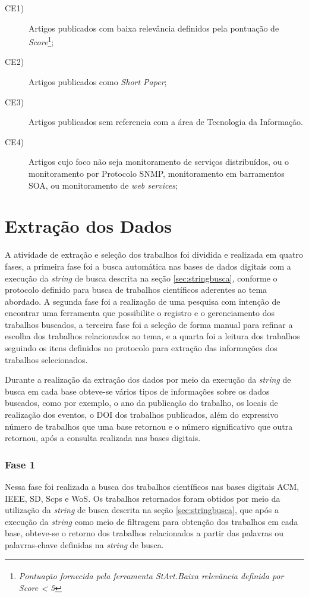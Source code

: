 \begin{description}
\item[CE1)] Artigos publicados com baixa relevância definidos pela pontuação de \textit{Score}\footnote{\textit{Pontuação fornecida pela ferramenta \acrshort{StArt}\textsuperscript{\textregistered}.Baixa relevância definida por \textit{Score} < 5}};
\item[CE2)] Artigos publicados como \textit{Short Paper};
\item[CE3)] Artigos publicados sem referencia com a área de Tecnologia da Informação.
\item[CE4)]Artigos cujo foco não seja monitoramento de serviços distribuídos, ou o monitoramento por Protocolo \acrshort{SNMP}, monitoramento em barramentos \acrshort{SOA}, ou monitoramento de \textit{web services};
\end{description}



\section{Extração dos Dados}
A atividade de extração e seleção dos trabalhos foi dividida e realizada em quatro fases, a primeira fase foi a busca automática nas bases de dados digitais com a execução da \textit{string} de busca descrita na seção \ref{sec:stringbusca}, conforme o protocolo definido para busca de trabalhos científicos aderentes ao tema abordado. A segunda fase foi a realização de uma pesquisa com intenção de encontrar uma ferramenta que possibilite o registro e o gerenciamento dos trabalhos buscados, a terceira fase foi a seleção de forma manual para refinar a escolha dos trabalhos relacionados ao tema, e a quarta foi a leitura dos trabalhos seguindo os itens definidos no protocolo para extração das informações dos trabalhos selecionados. 

Durante a realização da extração dos dados por meio da execução da \textit{string} de busca em cada base obteve-se vários tipos de informações sobre os dados buscados, como por exemplo, o ano da publicação do trabalho, os locais de realização dos eventos, o \acrshort{DOI} dos trabalhos publicados, além do  expressivo número de trabalhos que uma base retornou e o número significativo que outra retornou, após a consulta realizada nas bases digitais.

\subsubsection{Fase 1}
Nessa fase foi realizada a busca dos trabalhos científicos nas bases digitais \acrlong{ACM}, \acrlong{IEEE}, \acrlong{SD}, \acrlong{Scps} e \acrlong{WoS}. Os trabalhos retornados foram obtidos por meio da utilização da \textit{string} de busca descrita na seção \ref{sec:stringbusca}, que após a execução da \textit{string} como meio de filtragem para obtenção dos trabalhos em cada base, obteve-se o retorno dos trabalhos relacionados a partir das palavras ou palavras-chave definidas na \textit{string} de busca. 

